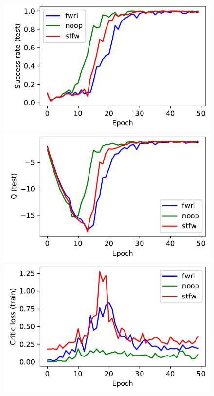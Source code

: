 %
\begin{figure}%
  \def\frac{0.24}
  \includegraphics[width=\frac\columnwidth]{media/res/ea0e35b-FetchPush-v1-stfw-future/test/success_rate.pdf}%
  \includegraphics[width=\frac\columnwidth]{media/res/ea0e35b-FetchPush-v1-stfw-future/test/mean_Q.pdf}%
  \includegraphics[width=\frac\columnwidth]{media/res/ea0e35b-FetchPush-v1-stfw-future/train/critic_loss.pdf}%

\end{figure}
